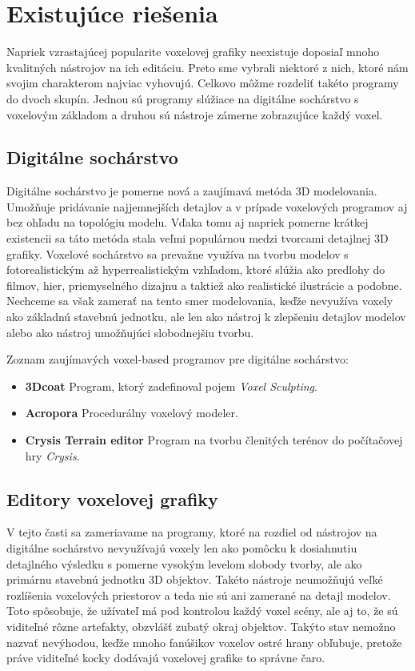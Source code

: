 \chapter{Existujúce riešenia}\label{chap:riesenia}
Napriek vzrastajúcej popularite voxelovej grafiky neexistuje doposiaľ mnoho kvalitných nástrojov na ich editáciu. Preto sme vybrali niektoré z nich, ktoré nám svojim charakterom najviac vyhovujú. 
Celkovo môžme rozdeliť takéto programy do dvoch skupín. Jednou sú programy slúžiace na digitálne sochárstvo s voxelovým základom a druhou sú nástroje zámerne zobrazujúce každý voxel.

\section{Digitálne sochárstvo}
Digitálne sochárstvo je pomerne nová a zaujímavá metóda 3D modelovania. Umožňuje pridávanie najjemnejších detajlov a v prípade voxelových programov aj bez ohľadu na topológiu modelu. Vďaka tomu aj napriek pomerne krátkej existencii sa táto metóda stala veľmi populárnou medzi tvorcami detajlnej 3D grafiky. Voxelové sochárstvo sa prevažne využíva na tvorbu modelov s fotorealistickým až hyperrealistickým vzhľadom, ktoré slúžia ako predlohy do filmov, hier, priemyselného dizajnu a taktiež ako realistické ilustrácie a podobne. Nechceme sa však zamerať na tento smer modelovania, keďže nevyužíva voxely ako základnú stavebnú jednotku, ale len ako nástroj k zlepšeniu detajlov modelov alebo ako nástroj umožňujúci slobodnejšiu tvorbu.

Zoznam zaujímavých voxel-based programov pre digitálne sochárstvo:
\begin{itemize}
	\item \textbf{3Dcoat} Program, ktorý zadefinoval pojem \textit{Voxel Sculpting}.
	\item \textbf{Acropora} Procedurálny voxelový modeler.
	\item \textbf{Crysis Terrain editor} Program na tvorbu členitých terénov do počítačovej hry \textit{Crysis}.
\end{itemize}

\section{Editory voxelovej grafiky}
V tejto časti sa zameriavame na programy, ktoré na rozdiel od nástrojov na digitálne sochárstvo nevyužívajú voxely len ako pomôcku k dosiahnutiu detajlného výsledku s pomerne vysokým levelom slobody tvorby, ale ako primárnu stavebnú jednotku 3D objektov. Takéto nástroje neumožňujú veľké rozlíšenia voxelových priestorov a teda nie sú ani zamerané na detajl modelov. Toto spôsobuje, že užívateľ má pod kontrolou každý voxel scény, ale aj to, že sú viditeľné rôzne artefakty, obzvlášť zubatý okraj objektov. Takýto stav nemožno nazvať nevýhodou, keďže mnoho fanúšikov voxelov ostré hrany obľubuje, pretože práve viditeľné kocky dodávajú voxelovej grafike to správne čaro.

